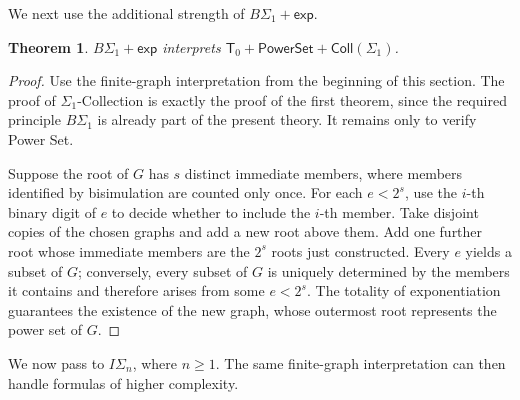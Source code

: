 \documentclass[11pt,a4paper]{article}
\newcommand{\IS}[1]{I\Sigma_{#1}}
\newcommand{\BS}[1]{B\Sigma_{#1}}
\newcommand{\expax}{\mathsf{exp}}
\newcommand{\Tzero}{\mathsf T_{0}}
\newcommand{\Coll}[1]{\mathsf{Coll}(#1)}
\newcommand{\Pow}{\mathsf{PowerSet}}
\theoremstyle{plain}
\newtheorem{theorem}{Theorem}[section]
\theoremstyle{definition}
\theoremstyle{remark}
\begin{document}
We next use the additional strength of \(\BS1+\expax\).

\begin{theorem}
  \(\BS1+\expax\) interprets \(\Tzero+\Pow+\Coll{\Sigma_1}\).
\end{theorem}
\begin{proof}
  Use the finite-graph interpretation from the beginning of this section. The proof of \(\Sigma_1\)-Collection is exactly the proof of the first theorem, since the required principle \(B\Sigma_1\) is already part of the present theory. It remains only to verify Power Set.

  Suppose the root of \(G\) has \(s\) distinct immediate members, where members identified by bisimulation are counted only once. For each \(e<2^s\), use the \(i\)-th binary digit of \(e\) to decide whether to include the \(i\)-th member. Take disjoint copies of the chosen graphs and add a new root above them. Add one further root whose immediate members are the \(2^s\) roots just constructed. Every \(e\) yields a subset of \(G\); conversely, every subset of \(G\) is uniquely determined by the members it contains and therefore arises from some \(e<2^s\). The totality of exponentiation guarantees the existence of the new graph, whose outermost root represents the power set of \(G\).
\end{proof}

We now pass to \(\IS{n}\), where \(n\geq1\). The same finite-graph interpretation can then handle formulas of higher complexity.
\end{document}
